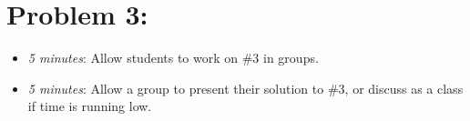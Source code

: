 \documentclass[handout,nooutcomes]{ximera}
\begin{document}
	
	
\section*{Problem 3:}

	\begin{itemize}
	
	\item  \emph{5 minutes}:  Allow students to work on \#3 in groups.  
	
	\item  \emph{5 minutes}:  Allow a group to present their solution to \#3, or discuss as a class if time is running low.
	
	\end{itemize}
	



	
	
	

	
	

	
	
	

	
	
	
\end{document}
